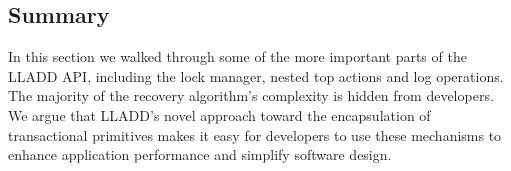\documentclass[10pt,letterpaper,twocolumn,english]{article}
\newcommand{\yad}{LLADD\xspace}
\newcommand{\eab}[1]{\textcolor{red}{\bf EAB: #1}}
\begin{document}




\subsection{Summary}

In this section we walked through some of the more important parts of
the \yad API, including the lock manager, nested top actions and log
operations.  The majority of the recovery algorithm's complexity is 
hidden from developers.  We argue that \yad's novel approach toward 
the encapsulation of transactional primitives makes it easy for 
developers to use these mechanisms to enhance application performance
and simplify software design.








\end{document}
